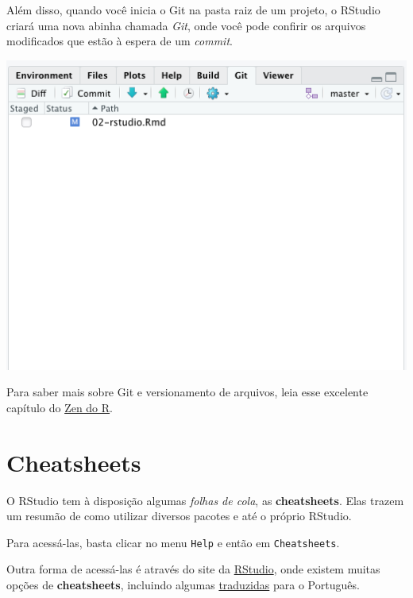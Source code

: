 \documentclass[
]{book}
\begin{document}
Além disso, quando você inicia o Git na pasta raiz de um projeto, o RStudio criará uma nova abinha chamada \emph{Git}, onde você pode confirir os arquivos modificados que estão à espera de um \emph{commit}.

\begin{center}\includegraphics[width=0.6\linewidth]{assets/img/rstudio/git-aba} \end{center}

Para saber mais sobre Git e versionamento de arquivos, leia esse excelente capítulo do \href{https://curso-r.github.io/zen-do-r/git-github.html}{Zen do R}.

\hypertarget{cheatsheets}{%
\section{Cheatsheets}\label{cheatsheets}}

O RStudio tem à disposição algumas \emph{folhas de cola}, as \textbf{cheatsheets}. Elas trazem um resumão de como utilizar diversos pacotes e até o próprio RStudio.

Para acessá-las, basta clicar no menu \texttt{Help} e então em \texttt{Cheatsheets}.

Outra forma de acessá-las é através do site da \href{https://rstudio.com/resources/cheatsheets/}{RStudio}, onde existem muitas opções de \textbf{cheatsheets}, incluindo algumas \href{https://rstudio.com/resources/cheatsheets/\#translations}{traduzidas} para o Português.
\end{document}

